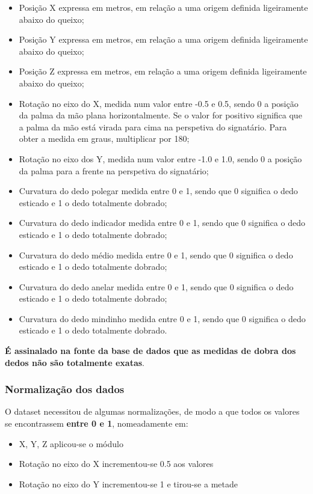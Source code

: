 \documentclass[10pt,a4paper]{article}
\begin{document}
\begin{itemize}
\item Posição X expressa em metros, em relação a uma origem definida ligeiramente abaixo do queixo;
\item Posição Y expressa em metros, em relação a uma origem definida ligeiramente abaixo do queixo;
\item Posição Z expressa em metros, em relação a uma origem definida ligeiramente abaixo do queixo;
\item Rotação no eixo do X, medida num valor entre -0.5 e 0.5, sendo 0 a posição da palma da mão plana horizontalmente. Se o valor for positivo significa que a palma da mão está virada para cima na perspetiva do signatário. Para obter a medida em graus, multiplicar por 180;
\item Rotação no eixo dos Y, medida num valor entre -1.0 e 1.0, sendo 0 a posição da palma para a frente na perspetiva do signatário;
\item Curvatura do dedo polegar medida entre 0 e 1, sendo que 0 significa o dedo esticado e 1 o dedo totalmente dobrado;
\item Curvatura do dedo indicador medida entre 0 e 1, sendo que 0 significa o dedo esticado e 1 o dedo totalmente dobrado;
\item Curvatura do dedo médio medida entre 0 e 1, sendo que 0 significa o dedo esticado e 1 o dedo totalmente dobrado;
\item Curvatura do dedo anelar medida entre 0 e 1, sendo que 0 significa o dedo esticado e 1 o dedo totalmente dobrado;
\item Curvatura do dedo mindinho medida entre 0 e 1, sendo que 0 significa o dedo esticado e 1 o dedo totalmente dobrado.
\end{itemize}
\textbf{É assinalado na fonte da base de dados que as medidas de dobra dos dedos não são totalmente exatas}.

\subsubsection{Normalização dos dados}

O dataset necessitou de algumas normalizações, de modo a que todos os valores se encontrassem \textbf{entre 0 e 1}, nomeadamente em:
\begin{itemize}
\item X, Y, Z aplicou-se o módulo
\item Rotação no eixo do X incrementou-se 0.5 aos valores
\item Rotação no eixo do Y incrementou-se 1 e tirou-se a metade
\end{itemize}
\end{document}
